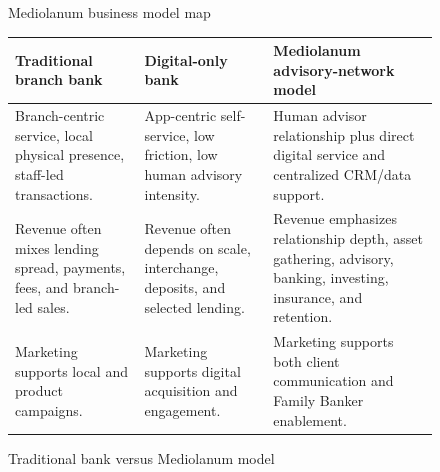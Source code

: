 \documentclass[
	11pt,
	fleqn,
	a4paper,
	oneside,
]{LegrandOrangeBook}
\begin{document}
\begin{figure}[H]
	\centering
	\caption{Mediolanum business model map}
\end{figure}

\begin{figure}[H]
	\centering
	\begin{tabularx}{\textwidth}{Y Y Y}
		\toprule
		\textbf{Traditional branch bank} & \textbf{Digital-only bank} & \textbf{Mediolanum advisory-network model}\\
		\midrule
		Branch-centric service, local physical presence, staff-led transactions. & App-centric self-service, low friction, low human advisory intensity. & Human advisor relationship plus direct digital service and centralized CRM/data support.\\
		Revenue often mixes lending spread, payments, fees, and branch-led sales. & Revenue often depends on scale, interchange, deposits, and selected lending. & Revenue emphasizes relationship depth, asset gathering, advisory, banking, investing, insurance, and retention.\\
		Marketing supports local and product campaigns. & Marketing supports digital acquisition and engagement. & Marketing supports both client communication and Family Banker enablement.\\
		\bottomrule
	\end{tabularx}
	\caption{Traditional bank versus Mediolanum model}
\end{figure}
\end{document}
